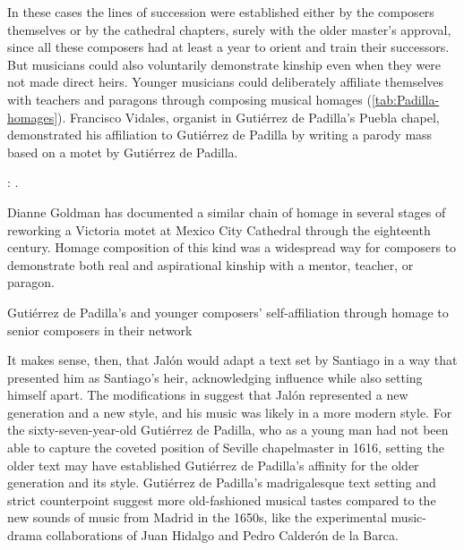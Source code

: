 In these cases the lines of succession were established either by the composers
themselves or by the cathedral chapters, surely with the older master's
approval, since all these composers had at least a year to orient and train
their successors.
But musicians could also voluntarily demonstrate kinship even when they were not
made direct heirs. 
Younger musicians could deliberately affiliate themselves with teachers and
paragons through composing musical homages (\cref{tab:Padilla-homages}).
Francisco Vidales, organist in Gutiérrez de Padilla's Puebla chapel,
demonstrated his affiliation to Gutiérrez de Padilla by writing a parody mass
based on a motet by Gutiérrez de Padilla.%
\begin{Footnote}
    \Autocite{Koegel:Padilla}: .
\end{Footnote}
Dianne Goldman has documented a similar chain of homage in several stages of
reworking a Victoria motet at Mexico City Cathedral through the eighteenth
century.%
    \Autocite{Goldman:StileAntico}
Homage composition of this kind was a widespread way for composers to
demonstrate both real and aspirational kinship with a mentor, teacher, or
paragon.

{Gutiérrez de Padilla's  and younger composers' self-affiliation
through homage to senior composers in their network}

It makes sense, then, that Jalón would adapt a text set by Santiago in a way
that presented him as Santiago's heir, acknowledging influence while also
setting himself apart.
The modifications in  suggest that Jalón
represented a new generation and a new style, and his music was likely in a more
modern style.
For the sixty-seven-year-old Gutiérrez de Padilla, who as a young man had not been able to
capture the coveted position of Seville chapelmaster in 1616, setting the older
text may have established Gutiérrez de Padilla's affinity for the older generation and its
style.
Gutiérrez de Padilla's madrigalesque text setting and strict counterpoint suggest more
old-fashioned musical tastes compared to the new sounds of music from Madrid in
the 1650s, like the experimental music-drama collaborations of Juan Hidalgo and
Pedro Calderón de la Barca.%
    \Autocite{Stein:Songs}


